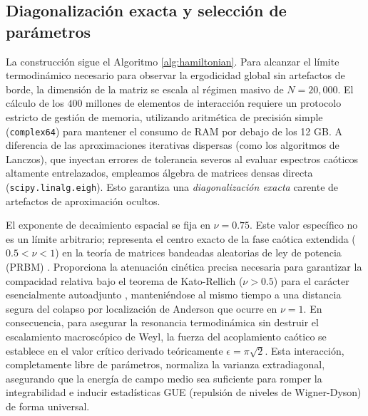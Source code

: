 \documentclass[aps,prl,preprint,superscriptaddress,floatfix]{revtex4-2}
\begin{document}
\subsection{Diagonalización exacta y selección de parámetros}
La construcción sigue el Algoritmo \ref{alg:hamiltonian}. Para alcanzar el límite termodinámico necesario para observar la ergodicidad global sin artefactos de borde, la dimensión de la matriz se escala al régimen masivo de $N=20,000$. El cálculo de los $400$ millones de elementos de interacción requiere un protocolo estricto de gestión de memoria, utilizando aritmética de precisión simple (\texttt{complex64}) para mantener el consumo de RAM por debajo de los 12 GB. A diferencia de las aproximaciones iterativas dispersas (como los algoritmos de Lanczos), que inyectan errores de tolerancia severos al evaluar espectros caóticos altamente entrelazados, empleamos álgebra de matrices densas directa (\texttt{scipy.linalg.eigh}). Esto garantiza una \textit{diagonalización exacta} carente de artefactos de aproximación ocultos.

El exponente de decaimiento espacial se fija en $\nu = 0.75$. Este valor específico no es un límite arbitrario; representa el centro exacto de la fase caótica extendida ($0.5 < \nu < 1$) en la teoría de matrices bandeadas aleatorias de ley de potencia (PRBM) \cite{Mirlin1996}. Proporciona la atenuación cinética precisa necesaria para garantizar la compacidad relativa bajo el teorema de Kato-Rellich ($\nu > 0.5$) para el carácter esencialmente autoadjunto \cite{ReedSimon1975}, manteniéndose al mismo tiempo a una distancia segura del colapso por localización de Anderson que ocurre en $\nu = 1$. En consecuencia, para asegurar la resonancia termodinámica sin destruir el escalamiento macroscópico de Weyl, la fuerza del acoplamiento caótico se establece en el valor crítico derivado teóricamente $\epsilon = \pi \sqrt{2}$. Esta interacción, completamente libre de parámetros, normaliza la varianza extradiagonal, asegurando que la energía de campo medio sea suficiente para romper la integrabilidad e inducir estadísticas GUE (repulsión de niveles de Wigner-Dyson) de forma universal.
\end{document}
